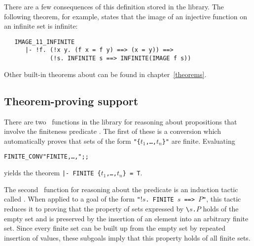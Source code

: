 \noindent There are a few consequences of this definition stored in the
 library.  The following theorem, for example, states that the
image of an injective function on an infinite set is infinite:

\begin{hol}
\begin{verbatim}
   IMAGE_11_INFINITE
      |- !f. (!x y. (f x = f y) ==> (x = y)) ==>
             (!s. INFINITE s ==> INFINITE(IMAGE f s))
\end{verbatim}\end{hol}

\noindent Other built-in theorems about  can be found in
chapter~\ref{theorems}.

\subsection{Theorem-proving support}

There are two \ML\ functions in the  library for reasoning about
propositions that involve the finiteness predicate .
The
 first of these is a
conversion  which automatically proves that sets of the form
{\small\verb!"{!\tt$t_1$,\dots,$t_n$\verb!}"!} are finite.  Evaluating

\begin{hol}
\begin{alltt}
   FINITE\_CONV "FINITE \lb{},\dots,\rb";;
\end{alltt}\end{hol}

\noindent yields the theorem
{\small\verb!|- FINITE {!\tt$t_1$,\dots,$t_n$\verb!} = T!}.%
%

The
second \ML\ function for
reasoning about the predicate  is an induction tactic called
.  When applied to a goal of the form
{\small\verb!"!!$s$\verb!. FINITE !$s$\verb! ==> !$P$\verb!"!}, this tactic
reduces it to proving that the property of sets expressed by
{\small\verb!\!$s$\verb!.!$P$} holds of the empty set and is preserved by the
insertion of an element into an arbitrary finite set.  Since every finite set
can be built up from the empty set by repeated insertion of values, these
subgoals imply that this property holds of all finite sets.

